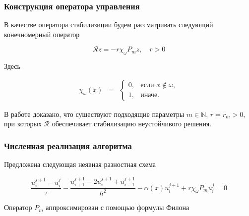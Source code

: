 \documentclass{beamer}
\newcommand{\operator}[1]{\mathcal{R}{#1}}
\begin{document}
\begin{frame}
\frametitle{Конструкция оператора управления}

В качестве оператора стабилизиции будем рассматривать следующий конечномерный оператор

\begin{block}{}
\begin{equation}
	\operator{z} = -r\chi_{\omega}P_mz, \quad r > 0
\end{equation}
\end{block}
Здесь 
\begin{block}{}
	\begin{equation}
    \begin{matrix}
	    \chi_{\omega}(x) & =
	    & \left\{
	    \begin{matrix}
	    0, & \mbox{если } x \notin \omega, \\
	    1, & \mbox{иначе. }
	    \end{matrix} \right.
	    \end{matrix}
    \end{equation}
\end{block}

В работе доказано, что существуют подходящие параметры $m \in \mathbb{N}$, $r = r_m > 0$, при которых $\operator{}$ обеспечивает стабилизацию неустойчивого решения.

\end{frame}


\begin{frame}
\frametitle{Численная реализация алгоритма}
Предложена следующая неявная разностная схема \\
\begin{block}{}
	\begin{equation}\label{scheme}
		\frac{u^{j + 1}_i - u^j_i}{\tau} - \frac{u_{i + 1}^{j + 1} - 2u_{i}^{j + 1} + u_{i - 1}^{j + 1}}{h^2} - \alpha(x) u^{j + 1}_i + r\chi_{\omega}P_m u^j_i = 0
	\end{equation}
\end{block}

Оператор $P_m$ аппроксимирован с помощью формулы Филона\\

\end{frame}
\end{document}
